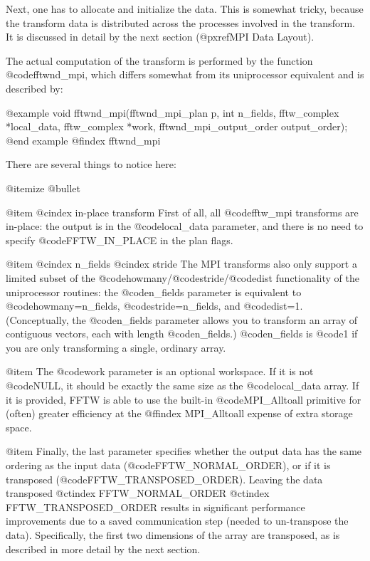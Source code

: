 Next, one has to allocate and initialize the data.  This is somewhat
tricky, because the transform data is distributed across the processes
involved in the transform.  It is discussed in detail by the next
section (@pxref{MPI Data Layout}).

The actual computation of the transform is performed by the function
@code{fftwnd_mpi}, which differs somewhat from its uniprocessor
equivalent and is described by:

@example
void fftwnd_mpi(fftwnd_mpi_plan p,
                int n_fields,
                fftw_complex *local_data, fftw_complex *work,
                fftwnd_mpi_output_order output_order);
@end example
@findex fftwnd_mpi

There are several things to notice here:

@itemize @bullet

@item
@cindex in-place transform
First of all, all @code{fftw_mpi} transforms are in-place: the output is
in the @code{local_data} parameter, and there is no need to specify
@code{FFTW_IN_PLACE} in the plan flags.

@item
@cindex n_fields
@cindex stride
The MPI transforms also only support a limited subset of the
@code{howmany}/@code{stride}/@code{dist} functionality of the
uniprocessor routines: the @code{n_fields} parameter is equivalent to
@code{howmany=n_fields}, @code{stride=n_fields}, and @code{dist=1}.
(Conceptually, the @code{n_fields} parameter allows you to transform an
array of contiguous vectors, each with length @code{n_fields}.)
@code{n_fields} is @code{1} if you are only transforming a single,
ordinary array.

@item
The @code{work} parameter is an optional workspace.  If it is not
@code{NULL}, it should be exactly the same size as the @code{local_data}
array.  If it is provided, FFTW is able to use the built-in
@code{MPI_Alltoall} primitive for (often) greater efficiency at the
@ffindex MPI_Alltoall
expense of extra storage space.

@item
Finally, the last parameter specifies whether the output data has the
same ordering as the input data (@code{FFTW_NORMAL_ORDER}), or if it is
transposed (@code{FFTW_TRANSPOSED_ORDER}).  Leaving the data transposed
@ctindex FFTW_NORMAL_ORDER
@ctindex FFTW_TRANSPOSED_ORDER
results in significant performance improvements due to a saved
communication step (needed to un-transpose the data).  Specifically, the
first two dimensions of the array are transposed, as is described in
more detail by the next section.

